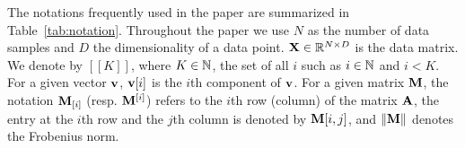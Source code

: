 
The notations frequently used in the paper are summarized in Table~\ref{tab:notation}. 
%
Throughout the paper we use $N$ as the number of data samples and $D$ the dimensionality of a data point. ${\mathbf{X}} \in \mathbb{R}^{N \times D}$ is the data matrix. We denote by $[\![K]\!]$, where $K \in {\mathbb{N}}$, the set of all $i$ such as $i \in {\mathbb{N}}$ and $i < K$.
%
For a given vector ${\mathbf{v}}$, ${\mathbf{v}}[i]$ is the $i$th component of ${\mathbf{v}}$.
%
For a given matrix ${\mathbf{M}}$, the notation ${\mathbf{M}}_{[i]}$ (resp. ${\mathbf{M}}^{[i]}$) refers to the $i$th row (column) of the matrix ${\mathbf{A}}$, the entry at the $i$th row and the $j$th column is denoted by ${\mathbf{M}}[i,j]$, and $\|{\mathbf{M}}\|$ denotes the Frobenius norm. 




